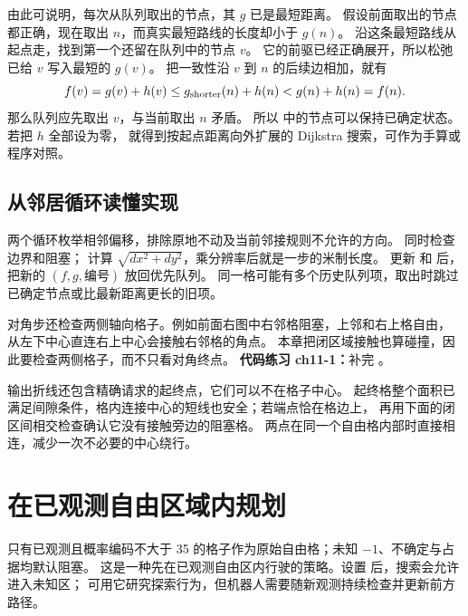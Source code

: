 由此可说明，每次从队列取出的节点，其 $g$ 已是最短距离。
假设前面取出的节点都正确，现在取出 $n$，而真实最短路线的长度却小于 $g(n)$。
沿这条最短路线从起点走，找到第一个还留在队列中的节点 $v$。
它的前驱已经正确展开，所以松弛已给 $v$ 写入最短的 $g(v)$。
把一致性沿 $v$ 到 $n$ 的后续边相加，就有
\begin{equation}
f(v)=g(v)+h(v)\leq g_{\rm shorter}(n)+h(n)<g(n)+h(n)=f(n).
\end{equation}
那么队列应先取出 $v$，与当前取出 $n$ 矛盾。
所以  中的节点可以保持已确定状态。若把 $h$ 全部设为零，
就得到按起点距离向外扩展的 Dijkstra 搜索，可作为手算或程序对照。

\subsection{从邻居循环读懂实现}
\par\noindent\begin{minipage}{\linewidth}

\end{minipage}\par
两个循环枚举相邻偏移，排除原地不动及当前邻接规则不允许的方向。
 同时检查边界和阻塞； 计算
$\sqrt{dx^2+dy^2}$，乘分辨率后就是一步的米制长度。
更新  和  后，把新的 $(f,g,\text{编号})$ 放回优先队列。
同一格可能有多个历史队列项，取出时跳过已确定节点或比最新距离更长的旧项。

对角步还检查两侧轴向格子。例如前面右图中右邻格阻塞，上邻和右上格自由，
从左下中心直连右上中心会接触右邻格的角点。
本章把闭区域接触也算碰撞，因此要检查两侧格子，而不只看对角终点。
\textbf{代码练习 ch11-1：}补完 。

输出折线还包含精确请求的起终点，它们可以不在格子中心。
起终格整个面积已满足间隙条件，格内连接中心的短线也安全；若端点恰在格边上，
再用下面的闭区间相交检查确认它没有接触旁边的阻塞格。
两点在同一个自由格内部时直接相连，减少一次不必要的中心绕行。

\clearpage
\section{在已观测自由区域内规划}
只有已观测且概率编码不大于 35 的格子作为原始自由格；未知 $-1$、不确定与占据均默认阻塞。
这是一种先在已观测自由区内行驶的策略。设置  后，搜索会允许进入未知区；
可用它研究探索行为，但机器人需要随新观测持续检查并更新前方路径。

